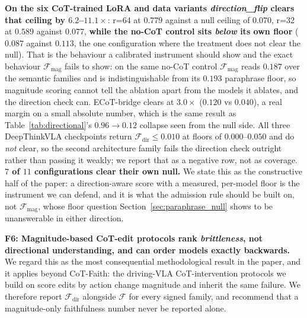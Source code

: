 \documentclass{article}
\begin{document}
\textbf{On the six CoT-trained LoRA and data variants \emph{direction\_flip} clears that ceiling by $6.2$--$11.1\times$}: r=64 at $0.779$ against a null ceiling of $0.070$, r=32 at $0.589$ against $0.077$, \textbf{while the no-CoT control sits \emph{below} its own floor} ($0.087$ against $0.113$, the one configuration where the treatment does not clear the null). That is the behaviour a calibrated instrument should show and the exact behaviour $\mathcal{F}_{\text{mag}}$ fails to show: on the same no-CoT control $\mathcal{F}_{\text{mag}}$ reads $0.187$ over the semantic families and is indistinguishable from its $0.193$ paraphrase floor, so magnitude scoring cannot tell the ablation apart from the models it ablates, and the direction check can. ECoT-bridge clears at $3.0\times$ ($0.120$ vs $0.040$), a real margin on a small absolute number, which is the same result as Table~\ref{tab:directional}'s $0.96 \to 0.12$ collapse seen from the null side. All three DeepThinkVLA checkpoints return $\mathcal{F}_{\text{dir}} \leq 0.010$ at floors of $0.000$--$0.050$ and do \emph{not} clear, so the second architecture family fails the direction check outright rather than passing it weakly; we report that as a negative row, not as coverage. \textbf{$7$ of $11$ configurations clear their own null.} We state this as the constructive half of the paper: a direction-aware score with a measured, per-model floor is the instrument we can defend, and it is what the admission rule should be built on, not $\mathcal{F}_{\text{mag}}$, whose floor question Section~\ref{sec:paraphrase_null} shows to be unanswerable in either direction.

\textbf{F6: Magnitude-based CoT-edit protocols rank \emph{brittleness}, not directional understanding, and can order models exactly backwards.} We regard this as the most consequential methodological result in the paper, and it applies beyond CoT-Faith: the driving-VLA CoT-intervention protocols we build on \citep{vladrivebench,pinocchio} score edits by action change magnitude and inherit the same failure. We therefore report $\mathcal{F}_{\text{dir}}$ alongside $\mathcal{F}$ for every signed family, and recommend that a magnitude-only faithfulness number never be reported alone.
\end{document}

